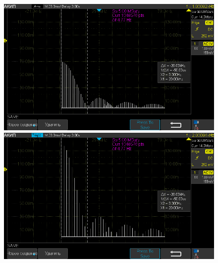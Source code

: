 \documentclass[12pt,a4paper]{article}
\begin{document}
\begin{figure}[H]
	\centering
	\begin{minipage}[b]{.5\textwidth}
		\centering
		\includegraphics[width=0.9\linewidth]{"photo/impulse1"}
	\end{minipage}%
	\begin{minipage}[b]{.5\textwidth}
		\centering
		\includegraphics[width=0.9\linewidth]{"photo/impulse2"}
	\end{minipage}
\end{figure}
\end{document}
